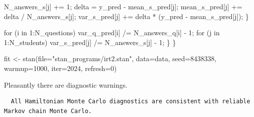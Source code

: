 \documentclass[
  letterpaper,
  DIV=11,
  numbers=noendperiod]{scrartcl}
\newenvironment{Shaded}{\begin{snugshade}}{\end{snugshade}}
\newcommand{\AttributeTok}[1]{\textcolor[rgb]{0.40,0.45,0.13}{#1}}
\newcommand{\ControlFlowTok}[1]{\textcolor[rgb]{0.00,0.23,0.31}{#1}}
\newcommand{\DecValTok}[1]{\textcolor[rgb]{0.68,0.00,0.00}{#1}}
\newcommand{\FunctionTok}[1]{\textcolor[rgb]{0.28,0.35,0.67}{#1}}
\newcommand{\NormalTok}[1]{\textcolor[rgb]{0.00,0.23,0.31}{#1}}
\newcommand{\OtherTok}[1]{\textcolor[rgb]{0.00,0.23,0.31}{#1}}
\newcommand{\SpecialCharTok}[1]{\textcolor[rgb]{0.37,0.37,0.37}{#1}}
\newcommand{\StringTok}[1]{\textcolor[rgb]{0.13,0.47,0.30}{#1}}
\begin{document}
\begin{codelisting}
\begin{Shaded}
\begin{Highlighting}[]
\NormalTok{      N\_answers\_s[j] += }\DecValTok{1}\NormalTok{;}
\NormalTok{      delta = y\_pred {-} mean\_s\_pred[j];}
\NormalTok{      mean\_s\_pred[j] += delta / N\_answers\_s[j];}
\NormalTok{      var\_s\_pred[j] += delta * (y\_pred {-} mean\_s\_pred[j]);}
\NormalTok{    \}}

    \ControlFlowTok{for}\NormalTok{ (i }\ControlFlowTok{in} \DecValTok{1}\NormalTok{:N\_questions)}
\NormalTok{      var\_q\_pred[i] /= N\_answers\_q[i] {-} }\DecValTok{1}\NormalTok{;}
    \ControlFlowTok{for}\NormalTok{ (j }\ControlFlowTok{in} \DecValTok{1}\NormalTok{:N\_students)}
\NormalTok{      var\_s\_pred[j] /= N\_answers\_s[j] {-} }\DecValTok{1}\NormalTok{;}
\NormalTok{  \}}
\NormalTok{\}}
\end{Highlighting}
\end{Shaded}

\end{codelisting}

\begin{Shaded}
\begin{Highlighting}[]
\NormalTok{fit }\OtherTok{\textless{}{-}} \FunctionTok{stan}\NormalTok{(}\AttributeTok{file=}\StringTok{"stan\_programs/irt2.stan"}\NormalTok{,}
            \AttributeTok{data=}\NormalTok{data, }\AttributeTok{seed=}\DecValTok{8438338}\NormalTok{,}
            \AttributeTok{warmup=}\DecValTok{1000}\NormalTok{, }\AttributeTok{iter=}\DecValTok{2024}\NormalTok{, }\AttributeTok{refresh=}\DecValTok{0}\NormalTok{)}
\end{Highlighting}
\end{Shaded}

Pleasantly there are diagnostic warnings.

\begin{Shaded}
\end{Shaded}

\begin{verbatim}
  All Hamiltonian Monte Carlo diagnostics are consistent with reliable
Markov chain Monte Carlo.
\end{verbatim}
\end{document}
